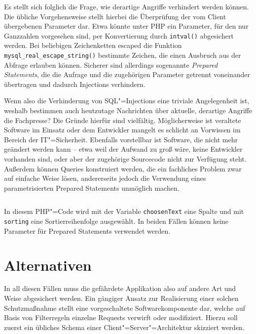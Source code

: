 Es stellt sich folglich die Frage, wie derartige Angriffe verhindert werden können. Die übliche Vorgehensweise stellt hierbei die Überprüfung der vom Client übergebenen Parameter dar. Etwa könnte unter PHP ein Parameter, für den nur Ganzzahlen vorgesehen sind, per Konvertierung durch \texttt{intval()} abgesichert werden. Bei beliebigen Zeichenketten escaped die Funktion \texttt{mysql_real_escape_string()} bestimmte Zeichen, die einen Ausbruch aus der Abfrage erlauben können. Sicherer sind allerdings sogenannte \emph{Prepared Statements}, die die Anfrage und die zugehörigen Parameter getrennt voneinander übertragen und dadurch Injections verhindern.

Wenn also die Verhinderung von SQL"=Injections eine triviale Angelegenheit ist, weshalb bestimmen auch heutzutage Nachrichten über aktuelle, derartige Angriffe die Fachpresse? Die Gründe hierfür sind vielfältig. Möglicherweise ist veraltete Software im Einsatz oder dem Entwickler mangelt es schlicht an Vorwissen im Bereich der IT"=Sicherheit.  Ebenfalls vorstellbar ist Software, die nicht mehr geändert werden kann -- etwa weil der Aufwand zu groß wäre, keine Entwickler vorhanden sind, oder aber der zugehörige Sourcecode nicht zur Verfügung steht. Außerdem können Queries konstruiert werden, die ein fachliches Problem zwar auf einfache Weise lösen, andererseits jedoch die Verwendung eines parametrisierten Prepared Statements unmöglich machen.

\begin{listing}
\begin{margincap}
\inputminted[startinline,obeytabs]{php}{imports/weak_features.php}
\caption{In diesem PHP"=Code wird mit der Variable \texttt{choosenText} eine Spalte und mit \texttt{sorting} eine Sortierreihenfolge ausgewählt. In beiden Fällen können keine Parameter für Prepared Statements verwendet werden.}
\label{lst:strange_query}
\end{margincap}
\end{listing}

\section{Alternativen}
In all diesen Fällen muss die gefährdete Applikation also auf andere Art und Weise abgesichert werden. Ein gängiger Ansatz zur Realisierung einer solchen Schutzmaßnahme stellt eine vorgeschaltete Softwarekomponente dar, welche auf Basis von Filterregeln einzelne Requests verwirft oder modifiziert. Hierzu soll zuerst ein übliches Schema einer Client"=Server"=Architektur skizziert werden.


